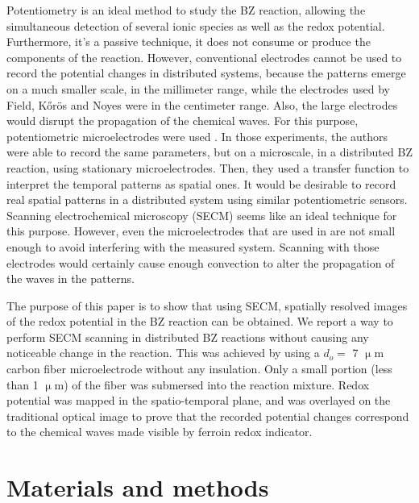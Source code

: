 \documentclass[3p, twocolumn]{elsarticle}
\begin{document}
Potentiometry is an ideal method to study the BZ reaction, allowing the simultaneous detection of several ionic species as well as the redox potential.
Furthermore, it's a passive technique, it does not consume or produce the components of the reaction.
However, conventional electrodes cannot be used to record the potential changes in distributed systems, because the patterns emerge on a much smaller scale, in the millimeter range, while the electrodes used by Field, Kőrös and Noyes were in the centimeter range.
Also, the large electrodes would disrupt the propagation of the chemical waves.
For this purpose, potentiometric microelectrodes were used \cite{hess2, hess3}.
In those experiments, the authors were able to record the same parameters, but on a microscale, in a distributed BZ reaction, using stationary microelectrodes.
Then, they used a transfer function to interpret the temporal patterns as spatial ones.
It would be desirable to record real spatial patterns in a distributed system using similar potentiometric sensors.
Scanning electrochemical microscopy (SECM) seems like an ideal technique for this purpose. 
However, even the microelectrodes that are used in \cite{hess2, hess3} are not small enough to avoid interfering with the measured system.
Scanning with those electrodes would certainly cause enough convection to alter the propagation of the waves in the patterns.

The purpose of this paper is to show that using SECM, spatially resolved images of the redox potential in the BZ reaction can be obtained.
We report a way to perform SECM scanning in distributed BZ reactions without causing any noticeable change in the reaction.
This was achieved by using a $d_o = $ 7 $\upmu$m carbon fiber microelectrode without any insulation.
Only a small portion (less than 1 $\upmu$m) of the fiber was submersed into the reaction mixture.
Redox potential was mapped in the spatio-temporal plane, and was overlayed on the traditional optical image to prove that the recorded potential changes correspond to the chemical waves made visible by ferroin redox indicator.

\section{Materials and methods}
\end{document}
